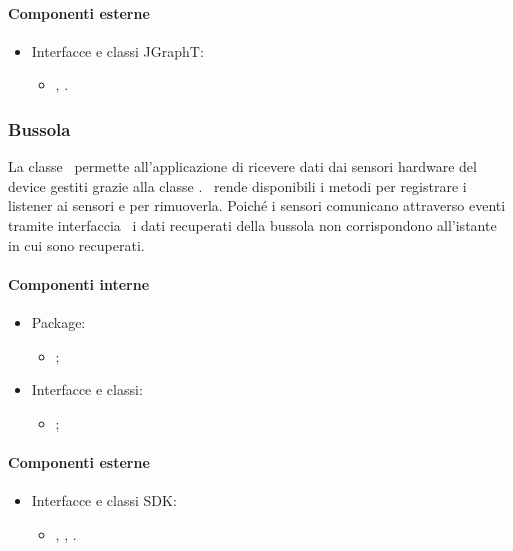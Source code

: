 \documentclass[../Funzionalita.tex]{subfiles}
\begin{document}
			
			\paragraph*{Componenti esterne}
			
			\begin{itemize}
				\item Interfacce e classi JGraphT:
				\begin{itemize}
					\item[] \DijkstraShorterPath, \SimpleDirectedWeightedGraph.
				\end{itemize}
			\end{itemize}
		
		
		\subsubsection{Bussola}
			La classe \Compass\ permette all'applicazione di ricevere dati dai sensori hardware del device gestiti grazie alla classe \Sensor. \Compass\ rende disponibili i metodi per registrare i listener ai sensori e per rimuoverla. Poiché i sensori comunicano attraverso eventi tramite interfaccia \SensorEventListener\ i dati recuperati della bussola non corrispondono all'istante in cui sono recuperati.
		
			\paragraph*{Componenti interne}
			\begin{itemize}
			
				\item Package:
				\begin{itemize}
					\item[] \compass;
				\end{itemize}
				
				\item Interfacce e classi:
				\begin{itemize}
					\item[] \Compass;
				\end{itemize}
				
			\end{itemize}
			
			
			\paragraph*{Componenti esterne}
			\begin{itemize}
			
				\item Interfacce e classi SDK:
				\begin{itemize}
					\item[] \SensorManager, \Sensor, \SensorEventListener.
				\end{itemize}
				
			\end{itemize}
						
\end{document}
